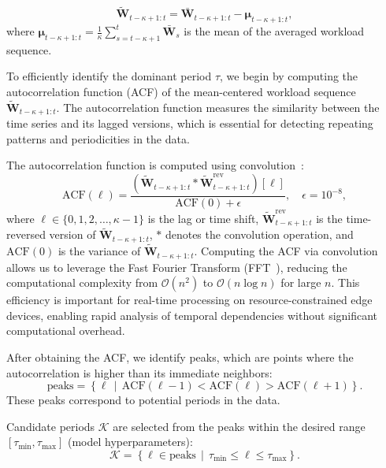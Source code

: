 \documentclass{ieeetmlcn}
\begin{document}
\begin{equation}
\label{eq:mean_removal}
\tilde{\mathbf{W}}_{t-\kappa+1:t} = \bar{\mathbf{W}}_{t-\kappa+1:t} - \boldsymbol{\mu}_{t-\kappa+1:t},
\end{equation}
where $\boldsymbol{\mu}_{t-\kappa+1:t} = \frac{1}{\kappa} \sum_{s=t-\kappa+1}^{t} \bar{\mathbf{W}}_s$ is the mean of the averaged workload sequence.

{\color{blue}
To efficiently identify the dominant period $\tau$, we begin by computing the autocorrelation function (ACF) of the mean-centered workload sequence $\tilde{\mathbf{W}}_{t-\kappa+1:t}$. The autocorrelation function measures the similarity between the time series and its lagged versions, which is essential for detecting repeating patterns and periodicities in the data.

The autocorrelation function is computed using convolution~\cite{zhang2020autocorrelation}:
\begin{equation}
\label{eq:acf}
\text{ACF}(\ell) = \frac{(\tilde{\mathbf{W}}_{t-\kappa+1:t} \ast \tilde{\mathbf{W}}^{\text{rev}}_{t-\kappa+1:t})[\ell]}{\text{ACF}(0) + \epsilon}, \quad \epsilon = 10^{-8},
\end{equation}
where $\ell \in \{0, 1, 2, \ldots, \kappa-1\}$ is the lag or time shift, $\tilde{\mathbf{W}}^{\text{rev}}_{t-\kappa+1:t}$ is the time-reversed version of $\tilde{\mathbf{W}}_{t-\kappa+1:t}$, $\ast$ denotes the convolution operation, and $\text{ACF}(0)$ is the variance of $\tilde{\mathbf{W}}_{t-\kappa+1:t}$. Computing the ACF via convolution allows us to leverage the Fast Fourier Transform (FFT~\cite{nussbaumer1982fast}), reducing the computational complexity from $\mathcal{O}(n^2)$ to $\mathcal{O}(n \log n)$ for large $n$. This efficiency is important for real-time processing on resource-constrained edge devices, enabling rapid analysis of temporal dependencies without significant computational overhead.

After obtaining the ACF, we identify peaks, which are points where the autocorrelation is higher than its immediate neighbors:
\begin{equation}
\label{eq:peak_detection}
\text{peaks} = \left\{ \ell \,\middle|\, \text{ACF}(\ell-1) < \text{ACF}(\ell) > \text{ACF}(\ell+1) \right\}.
\end{equation}
These peaks correspond to potential periods in the data.
}

Candidate periods $\mathcal{K}$ are selected from the peaks within the desired range $[\tau_{\min}, \tau_{\max}]$ (model hyperparameters):
\begin{equation}
\label{eq:candidate_periods}
\mathcal{K} = \left\{ \ell \in \text{peaks} \,\middle|\, \tau_{\min} \leq \ell \leq \tau_{\max} \right\}.
\end{equation}
\end{document}
